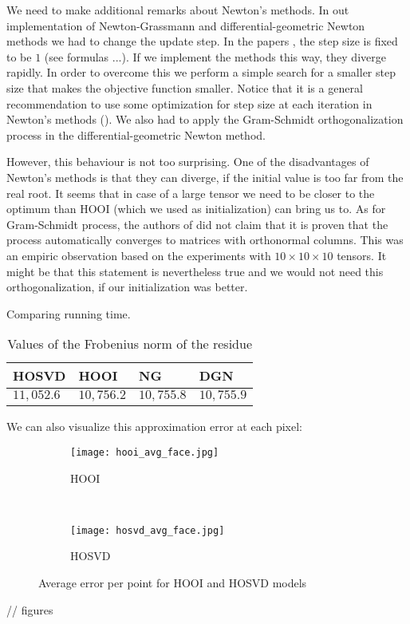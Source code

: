 We need to  make additional remarks about Newton's methods.
In out implementation of Newton-Grassmann and differential-geometric Newton
methods we had to change the update step. In the papers \cite{elden_savas_2007},
\cite{IDLAVH09} the step size is fixed to be $1$ (see formulas ...).
If we implement the methods this way, they diverge rapidly. In order to overcome
this we perform a simple search for a smaller step size that makes the objective
function smaller.
Notice that it is a general recommendation to use some optimization
for step size at each iteration in Newton's methods (\cite{num_recipes}).
We also had to apply the Gram-Schmidt 
orthogonalization process in the differential-geometric Newton method.


However, this behaviour is  not too surprising. One of the disadvantages
of Newton's methods is that they can diverge, if the initial value
is too far from the real root. It seems that in case of 
a large tensor we need to be closer to the optimum than HOOI (which we used
as initialization) can bring us to. As for Gram-Schmidt process,
the authors of \cite{IDLAVH09} did not claim that it is proven
that the process automatically converges to matrices with orthonormal 
columns. This was an empiric observation based on the experiments
with $10 \times 10 \times 10$ tensors. It might be that this statement
is  nevertheless true and we would not need this orthogonalization, if 
our initialization was better.



Comparing running time.

\begin{table}[h]
\centering
\begin{tabular}{|l|l|l|l|}
\hline
HOSVD & HOOI & NG & DGN \\ \hline
$11,052.6$  & $10,756.2$  & $10,755.8$ & $10,755.9$ \\ \hline
\end{tabular}
\caption{Values of the Frobenius norm of the residue}
\label{frob-norm-residue}
\end{table}


We can also visualize this approximation error at each pixel:

\begin{figure}
        \centering
        \begin{subfigure}[b]{0.6\textwidth}
                \texttt{[image: hooi\_avg\_face.jpg]}
                \caption{HOOI}
                \label{HOOI}
        \end{subfigure}%
        ~ %
        \begin{subfigure}[b]{0.55\textwidth}
                \texttt{[image: hosvd\_avg\_face.jpg]}
                \caption{HOSVD}
                \label{HOSVD}
        \end{subfigure}
        \caption{Average error per point for HOOI and HOSVD models}
        \label{fig:hooi_hosvd_comparison}
\end{figure}
// figures

